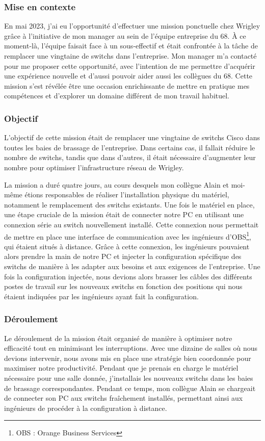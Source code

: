 \documentclass[12pt, a4paper]{article}
\begin{document}
\subsubsection{Mise en contexte}
En mai 2023, j'ai eu l'opportunité d'effectuer une mission
ponctuelle chez Wrigley grâce à l'initiative de mon manager au
sein de l'équipe entreprise du 68. À ce moment-là, l'équipe faisait
face à un sous-effectif et était confrontée à la tâche de remplacer
une vingtaine de switchs dans l'entreprise. Mon manager m'a
contacté pour me proposer cette opportunité, avec l'intention de
me permettre d'acquérir une expérience nouvelle et d'aussi
pouvoir aider aussi les collègues du 68. Cette mission
s'est révélée être une occasion enrichissante de mettre en pratique
mes compétences et d'explorer un domaine différent de mon travail habituel.

\subsubsection{Objectif}
L'objectif de cette mission était
de remplacer une vingtaine de switchs
Cisco dans toutes les baies de brassage de l'entreprise.
Dans certains cas, il fallait
réduire le nombre de switchs, tandis que dans d'autres, il
était nécessaire d'augmenter leur nombre pour optimiser
l'infrastructure réseau de Wrigley.

La mission a duré quatre jours, au cours desquels 
mon collègue Alain et moi-même étions responsables 
de réaliser l'installation physique
du matériel, notamment le remplacement des switchs existants.
Une fois le matériel en place, une étape cruciale de la mission
était de connecter notre PC en utilisant une connexion série au
switch nouvellement installé. Cette connexion nous
permettait de mettre en place une interface de communication
avec les ingénieurs d'OBS\footnote{OBS : Orange Business Services},
qui étaient situés à distance.
Grâce à cette connexion, les ingénieurs pouvaient alors prendre
la main de notre PC et injecter
la configuration spécifique des switchs de manière à les adapter
aux besoins et aux exigences de l'entreprise.
Une fois la configuration injectée, nous devions alors brasser 
les câbles des différents postes de travail sur les nouveaux switchs
en fonction des positions qui nous étaient indiquées par les
ingénieurs ayant fait la configuration.

\subsubsection{Déroulement}
Le déroulement de la mission était organisé de manière à optimiser
notre efficacité tout en minimisant les interruptions. Avec une
dizaine de salles où nous devions intervenir, nous avons mis en place une stratégie
bien coordonnée pour maximiser notre productivité. Pendant que je
prenais en charge le matériel nécessaire pour une salle donnée,
j'installais les nouveaux switchs dans les baies de brassage
correspondantes. Pendant ce temps, mon collègue Alain se chargeait
de connecter son PC aux switchs fraîchement installés, permettant
ainsi aux ingénieurs de procéder à la configuration à distance.
\end{document}
